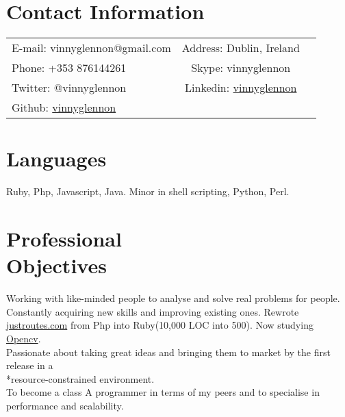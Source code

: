 \documentclass[margin,line]{resume}
\begin{document}
\begin{resume}

    \section{\mysidestyle Contact Information}

    \begin{tabular}{ l c l}
    E-mail: vinnyglennon@gmail.com & Address: Dublin, Ireland\\
    Phone: +353 876144261 & Skype: vinnyglennon\\
    Twitter: @vinnyglennon & Linkedin: \href{http://ie.linkedin.com/in/vinnyglennon}{vinnyglennon}\\
    Github: \href{https://github.com/vinnyglennon}{vinnyglennon} \\
    \end{tabular}

    \section{\mysidestyle Languages}
    Ruby, Php, Javascript, Java. Minor in shell scripting, Python, Perl.

    \section{\mysidestyle Professional \\ Objectives}
    Working with like-minded people to analyse and solve real problems for people.\vspace{1mm}\\%
    Constantly acquiring new skills and improving existing ones. Rewrote \href{http://justroutes.com}{justroutes.com} from Php into Ruby(10,000 LOC into 500). Now studying \href{http://opencv.willowgarage.com/wiki/}{Opencv}.\vspace{1mm}\\%
    Passionate about taking great ideas and bringing them to market by the first release in a \\*resource-constrained environment.\vspace{1mm}\\%
    To become a class A programmer in terms of my peers and to specialise in performance and scalability.
    

\end{resume}
\end{document}
